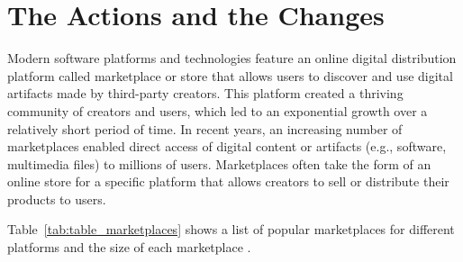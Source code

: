 \section{The Actions and the Changes}
Modern software platforms and technologies feature an online digital distribution platform called marketplace or store that allows users to discover and use digital artifacts made by third-party creators.
This platform created a thriving community of creators and users, which led to an exponential growth over a relatively short period of time.
In recent years, an increasing number of marketplaces enabled direct access of digital content or artifacts (e.g., software, multimedia files) to millions of users.
Marketplaces often take the form of an online store for a specific platform that allows creators to sell or distribute their products to users.
\begin{table}[h]
	\caption{Several popular digital marketplaces for different platforms.}
	\label{tab:table_marketplaces}
\end{table}
Table~\ref{tab:table_marketplaces} shows a list of popular marketplaces for different platforms and the size of each marketplace \cite{statista_app_stores, pinshape, wikipedia_chrome_web_store}.
